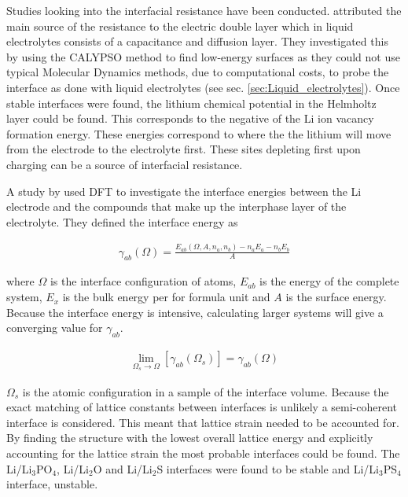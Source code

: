 \documentclass[../main.tex]{subfiles}
\begin{document}
Studies looking into the interfacial resistance have been conducted. \citeauthor{Tateyama2019} attributed the main source of the resistance to the electric double layer which in liquid electrolytes consists of a capacitance and diffusion layer.\cite{Tateyama2019} They investigated this by using the CALYPSO method to find low-energy surfaces\cite{Gao2019} as they could not use typical Molecular Dynamics methods, due to computational costs, to probe the interface as done with liquid electrolytes (see sec. \ref{sec:Liquid_electrolytes}). Once stable interfaces were found, the lithium chemical potential in the Helmholtz layer could be found. This corresponds to the negative of the Li ion vacancy formation energy. These energies correspond to where the the lithium will move from the electrode to the electrolyte first. These sites depleting first upon charging can be a source of interfacial resistance. 

A study by \citeauthor{Lepley2015} used DFT to investigate the interface energies between the Li electrode and the compounds that make up the interphase layer of the electrolyte.\cite{Lepley2015} They defined the interface energy as 

\begin{gather}
    \gamma_{ab}(\Omega)=\frac{E_{ab}(\Omega,A,n_a,n_b)-n_aE_a-n_bE_b}{A}
\end{gather}

where $\Omega$ is the interface configuration of atoms, $E_{ab}$ is the energy of the complete system, $E_x$ is the bulk energy per for formula unit and $A$ is the surface energy. Because the interface energy is intensive, calculating larger systems will give a converging value for $\gamma_{ab}$.

\begin{gather}
    \lim_{\Omega_s \rightarrow \Omega} \left[\gamma_{ab}(\Omega_s)\right]=\gamma_{ab}(\Omega)
\end{gather}

$\Omega_s$ is the atomic configuration in a sample of the interface volume. Because the exact matching of lattice constants between interfaces is unlikely a semi-coherent interface is considered. This meant that lattice strain needed to be accounted for. By finding the structure with the lowest overall lattice energy and explicitly accounting for the lattice strain the most probable interfaces could be found. The Li/Li$_3$PO$_4$, Li/Li$_2$O and Li/Li$_2$S interfaces were found to be stable and Li/Li$_3$PS$_4$ interface, unstable.
\end{document}
